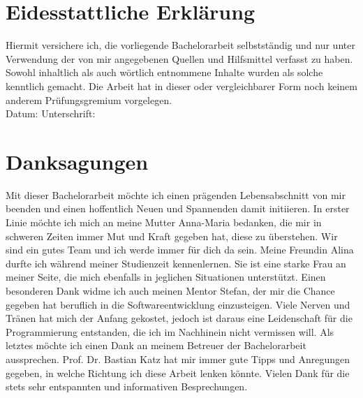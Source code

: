 \setcounter{secnumdepth}{0}
\section{Eidesstattliche Erklärung}

Hiermit versichere ich, die vorliegende Bachelorarbeit selbstständig und nur unter Verwendung der von mir angegebenen Quellen und Hilfsmittel verfasst zu haben. Sowohl inhaltlich als auch wörtlich entnommene Inhalte wurden als solche kenntlich gemacht. Die Arbeit hat in dieser oder vergleichbarer Form noch keinem anderem Prüfungsgremium vorgelegen.
\\[1.5cm]
Datum:	\hrulefill\enspace Unterschrift: \hrulefill


\newpage

\section{Danksagungen}
Mit dieser Bachelorarbeit möchte ich einen prägenden Lebensabschnitt von mir beenden und einen hoffentlich Neuen und Spannenden damit initiieren. In erster Linie möchte ich mich an meine Mutter Anna-Maria bedanken, die mir in schweren Zeiten immer Mut und Kraft gegeben hat, diese zu überstehen. Wir sind ein gutes Team und ich werde immer für dich da sein. Meine Freundin Alina durfte ich während meiner Studienzeit kennenlernen. Sie ist eine starke Frau an meiner Seite, die mich ebenfalls in jeglichen Situationen unterstützt. Einen besonderen Dank widme ich auch meinen Mentor Stefan, der mir die Chance gegeben hat beruflich in die Softwareentwicklung einzusteigen. Viele Nerven und Tränen hat mich der Anfang gekostet, jedoch ist daraus eine Leidenschaft für die Programmierung entstanden, die ich im Nachhinein nicht vermissen will. Als letztes möchte ich einen Dank an meinem Betreuer der Bachelorarbeit aussprechen. Prof. Dr. Bastian Katz hat mir immer gute Tipps und Anregungen gegeben, in welche Richtung ich diese Arbeit lenken könnte. Vielen Dank für die stets sehr entspannten und informativen Besprechungen.

